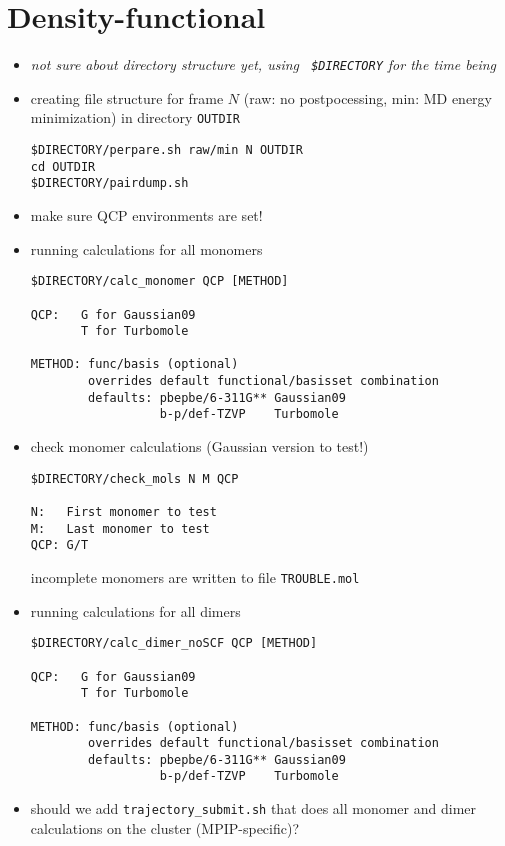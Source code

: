 \section{Density-functional}
\label{sec:dft}

\begin{itemize}
\item {\it not sure about directory structure yet, using {\tt
      \$DIRECTORY} for the time being}
\item creating file structure for frame $N$ (raw: no postpocessing,
  min: MD energy minimization) in directory {\tt OUTDIR}
\begin{verbatim}
$DIRECTORY/perpare.sh raw/min N OUTDIR
cd OUTDIR
$DIRECTORY/pairdump.sh
\end{verbatim}
\item make sure QCP environments are set!
\item running calculations for all monomers
 \begin{verbatim}
$DIRECTORY/calc_monomer QCP [METHOD]

QCP:   G for Gaussian09
       T for Turbomole

METHOD: func/basis (optional)
        overrides default functional/basisset combination
        defaults: pbepbe/6-311G** Gaussian09
                  b-p/def-TZVP    Turbomole
\end{verbatim}
\item check monomer calculations (Gaussian version to test!) 
\begin{verbatim}
$DIRECTORY/check_mols N M QCP

N:   First monomer to test
M:   Last monomer to test
QCP: G/T 
\end{verbatim}
incomplete monomers are written to file {\tt TROUBLE.mol}
\item running calculations for all dimers
 \begin{verbatim}
$DIRECTORY/calc_dimer_noSCF QCP [METHOD]

QCP:   G for Gaussian09
       T for Turbomole

METHOD: func/basis (optional)
        overrides default functional/basisset combination
        defaults: pbepbe/6-311G** Gaussian09
                  b-p/def-TZVP    Turbomole
\end{verbatim}
\item should we add {\tt trajectory\_submit.sh} that does all monomer
  and dimer calculations on the cluster (MPIP-specific)?
\end{itemize}
